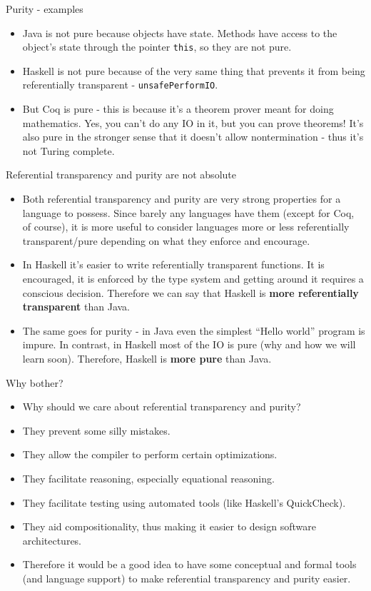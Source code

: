 \documentclass{beamer}
\begin{document}
\begin{frame}{Purity - examples}
\begin{itemize}
	\item Java is not pure because objects have state. Methods have access to the object's state through the pointer \texttt{this}, so they are not pure.
	\item Haskell is not pure because of the very same thing that prevents it from being referentially transparent - \texttt{unsafePerformIO}.
	\item But Coq is pure - this is because it's a theorem prover meant for doing mathematics. Yes, you can't do any IO in it, but you can prove theorems! It's also pure in the stronger sense that it doesn't allow nontermination - thus it's not Turing complete.
\end{itemize}
\end{frame}

\begin{frame}{Referential transparency and purity are not absolute}
\begin{itemize}
	\item Both referential transparency and purity are very strong properties for a language to possess. Since barely any languages have them (except for Coq, of course), it is more useful to consider languages more or less referentially transparent/pure depending on what they enforce and encourage.
	\item In Haskell it's easier to write referentially transparent functions. It is encouraged, it is enforced by the type system and getting around it requires a conscious decision. Therefore we can say that Haskell is \textbf{more referentially transparent} than Java.
	\item The same goes for purity - in Java even the simplest ``Hello world'' program is impure. In contrast, in Haskell most of the IO is pure (why and how we will learn soon). Therefore, Haskell is \textbf{more pure} than Java.
\end{itemize}
\end{frame}

\begin{frame}{Why bother?}
\begin{itemize}
	\item Why should we care about referential transparency and purity?
	\item They prevent some silly mistakes.
	\item They allow the compiler to perform certain optimizations.
	\item They facilitate reasoning, especially equational reasoning.
	\item They facilitate testing using automated tools (like Haskell's QuickCheck).
	\item They aid compositionality, thus making it easier to design software architectures.
	\item Therefore it would be a good idea to have some conceptual and formal tools (and language support) to make referential transparency and purity easier.
\end{itemize}
\end{frame}
\end{document}
